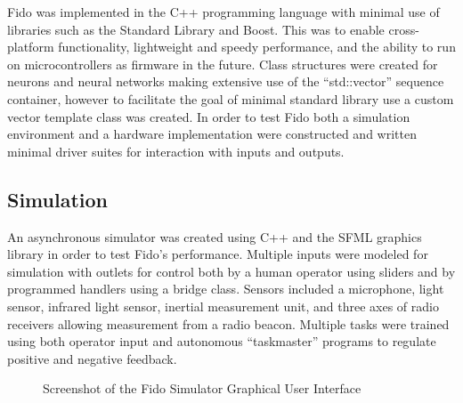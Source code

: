 Fido was implemented in the C++ programming language with minimal use of libraries such as the Standard Library and Boost.  This was to enable cross-platform functionality, lightweight and speedy performance, and the ability to run on microcontrollers as firmware in the future.  Class structures were created for neurons and neural networks making extensive use of the ``std::vector'' sequence container, however to facilitate the goal of minimal standard library use a custom vector template class was created.  In order to test Fido both a simulation environment and a hardware implementation were constructed and written minimal driver suites for interaction with inputs and outputs. 

\subsection{Simulation}

An asynchronous simulator was created using C++ and the SFML graphics library in order to test Fido's performance.  Multiple inputs were modeled for simulation with outlets for control both by a human operator using sliders and by programmed handlers using a bridge class.  Sensors included a microphone, light sensor, infrared light sensor, inertial measurement unit, and three axes of radio receivers allowing measurement from a radio beacon.  Multiple tasks were trained using both operator input and autonomous ``taskmaster'' programs to regulate positive and negative feedback.


\begin{figure}
	\centering
	\caption{Screenshot of the Fido Simulator Graphical User Interface}
\end{figure}

